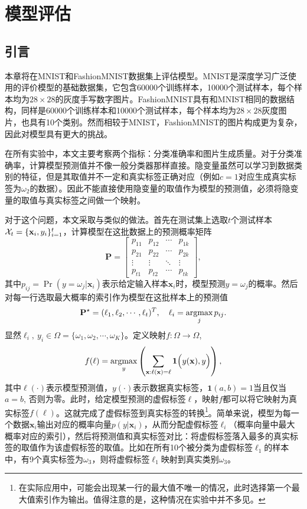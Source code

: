 \chapter{模型评估}\label{chap:experiments}

\section{引言}
本章将在MNIST\citep{lecun1989backpropagation}和FashionMNIST\citep{xiao2017/online}数据集上评估模型。MNIST是深度学习广泛使用的评价模型的基础数据集，它包含60000个训练样本，10000个测试样本，每个样本均为$28\times 28$的灰度手写数字图片。FashionMNIST具有和MNIST相同的数据结构，同样是60000个训练样本和10000个测试样本，每个样本均为$28\times 28$灰度图片，也具有10个类别。然而相较于MNIST，FashionMNIST的图片构成更为复杂，因此对模型具有更大的挑战。

在所有实验中，本文主要考察两个指标：分类准确率和图片生成质量。对于分类准确率，计算模型预测值并不像一般分类器那样直接。隐变量虽然可以学习到数据类别的特征，但是其取值并不一定和真实标签正确对应（例如$c=1$对应生成真实标签为$\omega_2$的数据）。因此不能直接使用隐变量的取值作为模型的预测值，必须将隐变量的取值与真实标签之间做一个映射。

对于这个问题，本文采取与\citet{springenberg2015unsupervised}类似的做法。首先在测试集上选取$t$个测试样本$\mathcal{X}_t = \{\mathbf{x}_i, y_i\}_{i=1}^t$，计算模型在这批数据上的预测概率矩阵
\[
  \mathbf{P} = 
\begin{bmatrix}
  p_{11} & p_{12} & \cdots & p_{1k} \\
  p_{21} & p_{22} & \cdots & p_{2k} \\
  \vdots & \vdots & \ddots & \vdots \\
  p_{t1} & p_{t2} & \cdots & p_{tk}
\end{bmatrix},
\]
其中$p_{ij} = \Pr(y=\omega_j | \mathbf{x}_i)$表示给定输入样本$\mathbf{x}_i$时，模型预测$y = \omega_j$的概率。然后对每一行选取最大概率的索引作为模型在这批样本上的预测值
\[
  \mathbf{P}^{\star} = (\ell_1, \ell_2, \cdots, \ell_t)^T, \quad \ell_i = \mathop{\text{argmax}}_j p_{ij}.
\]
显然$\ell_i, ~y_i \in \Omega = \{\omega_1, \omega_2, \cdots, \omega_K\}$。定义映射$f: \Omega \to \Omega$,
\[
  f(\ell) = \mathop{\text{argmax}}_y \left( 
    \sum_{\mathbf{x}: \ell(\mathbf{x}) = \ell} \mathbf{1}\Big(y(\mathbf{x}), y\Big) 
  \right),
\]
其中$\ell(\cdot)$表示模型预测值，$y(\cdot)$表示数据真实标签，$\mathbf{1}(a, b) = 1$当且仅当$a = b$, 否则为零。此时，给定模型预测的虚假标签$\ell$，映射$f$都可以将它映射为真实标签$f(\ell)$。这就完成了虚假标签到真实标签的转换\footnote{在实际应用中，可能会出现某一行的最大值不唯一的情况，此时选择第一个最大值索引作为输出。值得注意的是，这种情况在实验中并不多见。}。简单来说，模型为每一个数据$\mathbf{x}_i$输出对应的概率向量$p(y|\mathbf{x}_i)$，从而分配虚假标签$\ell_i$（概率向量中最大概率对应的索引），然后将预测值和真实标签对比：将虚假标签落入最多的真实标签的取值作为该虚假标签的取值。比如在所有10个被分类为虚假标签$\ell_1$的样本中，有9个真实标签为$\omega_3$，则将虚假标签$\ell_1$映射到真实类别$\omega_3$。

